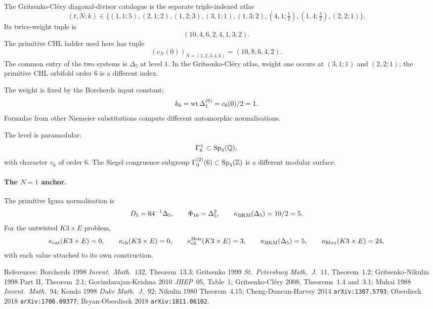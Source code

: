 The Gritsenko-Cl\'ery diagonal-divisor catalogue is the separate
triple-indexed atlas
\[
 (t,N;k)\in\{(1,1;5),(2,1;2),(1,2;3),(3,1;1),(1,3;2),
 (4,1;\tfrac12),(1,4;\tfrac32),(2,2;1)\}.
\]
Its twice-weight tuple is
\[
  (10,4,6,2,4,1,3,2).
\]
The primitive CHL ladder used here has tuple
\[
  (c_N(0))_{N=(1,2,3,4,6)}=(10,8,6,4,2).
\]
The common entry of the two systems is $\Delta_5$ at level $1$.
In the Gritsenko-Cl\'ery atlas, weight one occurs at $(3,1;1)$ and
$(2,2;1)$; the primitive CHL orbifold order $6$ is a different index.

The weight is fixed by the Borcherds input constant:
\[
  k_6=\mathrm{wt}\,\Delta_{1}^{(6)}=c_6(0)/2=1.
\]
Formulae from other Niemeier substitutions compute different
automorphic normalisations.

The level is paramodular:
\[
  \Gamma_{6}^{+}\subset\mathrm{Sp}_4(\mathbb{Q}),
\]
with character $v_6$ of order $6$. The Siegel congruence subgroup
$\Gamma_0^{(2)}(6)\subset\mathrm{Sp}_4(\mathbb{Z})$ is a different modular surface.

\paragraph{The $N=1$ anchor.}
The primitive Igusa normalisation is
\[
  D_5=64^{-1}\Delta_5,
  \qquad
  \Phi_{10}=\Delta_5^2,
  \qquad
  \kappa_{\mathrm{BKM}}(\Delta_5)=10/2=5.
\]
For the untwisted $K3\times E$ problem,
\[
  \kappa_{\mathrm{cat}}(K3\times E)=0,\qquad
  \kappa_{\mathrm{ch}}(K3\times E)=0,\qquad
  \kappa_{\mathrm{ch}}^{\mathrm{Heis}}(K3\times E)=3,\qquad
  \kappa_{\mathrm{BKM}}(\Delta_5)=5,\qquad
  \kappa_{\mathrm{fiber}}(K3\times E)=24,
\]
with each value attached to its own construction.

References: Borcherds 1998 \emph{Invent.\ Math.}~$132$, Theorem~13.3;
Gritsenko 1999 \emph{St.\ Petersburg Math.\ J.}~$11$, Theorem~1.2;
Gritsenko-Nikulin 1998 Part II, Theorem~2.1;
Govindarajan-Krishna 2010 \emph{JHEP}~$05$, Table~1;
Gritsenko-Cl\'ery 2008, Theorems~1.4 and~3.1;
Mukai 1988 \emph{Invent.\ Math.}~$94$; Kondo 1998
\emph{Duke Math.\ J.}~$92$; Nikulin 1980 Theorem~4.15;
Cheng-Duncan-Harvey 2014 \texttt{arXiv:1307.5793};
Oberdieck 2018 \texttt{arXiv:1706.09377};
Bryan-Oberdieck 2018 \texttt{arXiv:1811.06102}.
